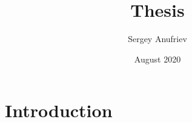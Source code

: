\documentclass{article}
\title{Thesis}
\author{Sergey Anufriev}
\date{August 2020}
\begin{document}
\maketitle

\section{Introduction}
\end{document}
